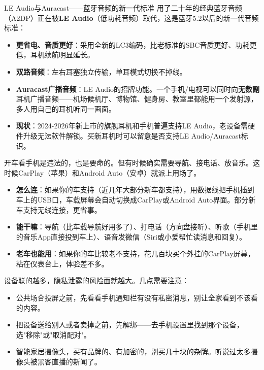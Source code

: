 \begin{tcbinfo}{LE Audio与Auracast——蓝牙音频的新一代标准}
用了二十年的经典蓝牙音频（A2DP）正在被\textbf{LE Audio}（低功耗音频）取代，这是蓝牙5.2以后的新一代音频标准：

\begin{itemize}
  \item \textbf{更省电、音质更好}：采用全新的LC3编码，比老标准的SBC音质更好、功耗更低，耳机续航明显延长。
  \item \textbf{双路音频}：左右耳塞独立传输，单耳模式切换不掉线。
  \item \textbf{Auracast广播音频}：LE Audio的招牌功能。一个手机/电视可以同时向\textbf{无数副}耳机广播音频——机场候机厅、博物馆、健身房、教室里都能用一个发射源，多人用自己的耳机听同一画面。
  \item \textbf{现状}：2024-2026年新上市的旗舰耳机和手机普遍支持LE Audio，老设备需硬件升级无法软件解锁。买新耳机时可以留意是否支持LE Audio/Auracast标识。
\end{itemize}

\end{tcbinfo}


开车看手机是违法的，也是要命的。但有时候确实需要导航、接电话、放音乐。这时候CarPlay（苹果）和Android Auto（安卓）就派上用场了。

\begin{itemize}
  \item \textbf{怎么连}：如果你的车支持（近几年大部分新车都支持），用数据线把手机插到车上的USB口，车载屏幕会自动切换成CarPlay或Android Auto界面。部分新车支持无线连接，更省事。
  \item \textbf{能干嘛}：导航（比车载导航好用多了）、打电话（方向盘接听）、听歌（手机里的音乐App直接投到车上）、语音发微信（Siri或小爱帮忙读消息和回复）。
  \item \textbf{老车也能用}：如果你的车比较老不支持，花几百块买个外挂的CarPlay屏幕，粘在仪表台上，体验差不多。
\end{itemize}


设备联的越多，隐私泄露的风险面就越大。几点需要注意：

\begin{itemize}
  \item 公共场合投屏之前，先看看手机通知栏有没有私密消息，别让全家看到不该看的内容。
  \item 把设备送给别人或者卖掉之前，先解绑——去手机设置里找到那个设备，选"移除"或"取消配对"。
  \item 智能家居摄像头，买有品牌的、有加密的，别买几十块的杂牌。听说过太多摄像头被黑客直播的新闻了。
\end{itemize}

